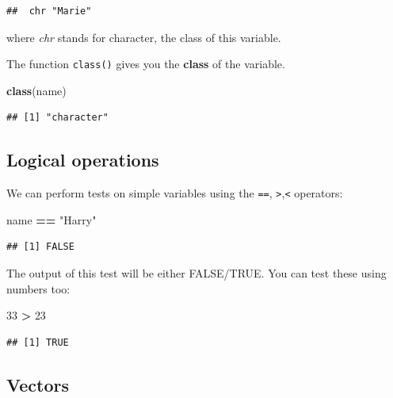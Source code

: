 \documentclass[
]{book}
\newenvironment{Shaded}{\begin{snugshade}}{\end{snugshade}}
\newcommand{\DecValTok}[1]{\textcolor[rgb]{0.00,0.00,0.81}{#1}}
\newcommand{\FunctionTok}[1]{\textcolor[rgb]{0.13,0.29,0.53}{\textbf{#1}}}
\newcommand{\NormalTok}[1]{#1}
\newcommand{\SpecialCharTok}[1]{\textcolor[rgb]{0.81,0.36,0.00}{\textbf{#1}}}
\newcommand{\StringTok}[1]{\textcolor[rgb]{0.31,0.60,0.02}{#1}}
\begin{document}
\begin{verbatim}
##  chr "Marie"
\end{verbatim}

where \emph{chr} stands for character, the class of this variable.

The function \texttt{class()} gives you the \textbf{class} of the variable.

\begin{Shaded}
\begin{Highlighting}[]
\FunctionTok{class}\NormalTok{(name)}
\end{Highlighting}
\end{Shaded}

\begin{verbatim}
## [1] "character"
\end{verbatim}

\hypertarget{logical-operations}{%
\subsection*{Logical operations}\label{logical-operations}}

We can perform tests on simple variables using the \texttt{==}, \texttt{\textgreater{}},\texttt{\textless{}} operators:

\begin{Shaded}
\begin{Highlighting}[]
\NormalTok{name }\SpecialCharTok{==} \StringTok{"Harry"}
\end{Highlighting}
\end{Shaded}

\begin{verbatim}
## [1] FALSE
\end{verbatim}

The output of this test will be either FALSE/TRUE.
You can test these using numbers too:

\begin{Shaded}
\begin{Highlighting}[]
\DecValTok{33} \SpecialCharTok{\textgreater{}} \DecValTok{23}
\end{Highlighting}
\end{Shaded}

\begin{verbatim}
## [1] TRUE
\end{verbatim}

\hypertarget{vectors}{%
\subsection*{Vectors}\label{vectors}}
\end{document}
